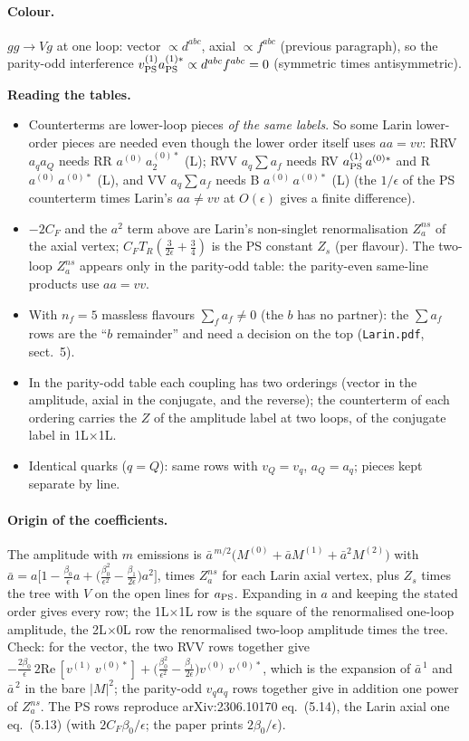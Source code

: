 \documentclass[11pt,a4paper]{article}
\newcommand{\ep}{\epsilon}
\renewcommand{\Re}{\mathrm{Re}\,}
\newcommand{\PS}{_{\rm PS}}
\newcommand{\pc}[4]{#1^{(#2)}\,#3^{(#4)*}}
\newcommand{\note}[1]{\par\smallskip\noindent\colorbox{gray!12}{\parbox{\dimexpr\linewidth-2\fboxsep}{\small #1}}\par\smallskip}
\begin{document}
\paragraph{Colour.} $gg\to Vg$ at one loop: vector $\propto d^{abc}$, axial $\propto f^{abc}$ (previous paragraph), so the
parity-odd interference $v\PS^{(1)}a\PS^{(1)*}\propto d^{abc}f^{abc}=0$ (symmetric times antisymmetric).

\note{\textbf{Reading the tables.}
\begin{itemize}
\item Counterterms are lower-loop pieces \emph{of the same labels}. So some Larin lower-order pieces are needed even
though the lower order itself uses $aa=vv$: RRV $a_qa_Q$ needs RR $\pc a0{a_2}0$ (L); RVV $a_q\sum a_f$ needs RV
$\pc{a\PS}1a0$ and R $\pc a0a0$ (L), and VV $a_q\sum a_f$ needs B $\pc a0a0$ (L) (the $1/\ep$ of the PS counterterm
times Larin's $aa\neq vv$ at $O(\ep)$ gives a finite difference).
\item $-2C_F$ and the $a^2$ term above are Larin's non-singlet renormalisation $Z_a^{ns}$ of the axial vertex;
$C_FT_R(\frac3{2\ep}+\frac34)$ is the PS constant $Z_s$ (per flavour). The two-loop $Z_a^{ns}$ appears only in the
parity-odd table: the parity-even same-line products use $aa=vv$.
\item With $n_f=5$ massless flavours $\sum_fa_f\neq0$ (the $b$ has no partner): the $\sum a_f$ rows are the ``$b$
remainder'' and need a decision on the top (\texttt{Larin.pdf}, sect.~5).
\item In the parity-odd table each coupling has two orderings (vector in the amplitude, axial in the conjugate, and
the reverse); the counterterm of each ordering carries the $Z$ of the amplitude label at two loops, of the conjugate
label in 1L$\times$1L.
\item Identical quarks ($q=Q$): same rows with $v_Q=v_q$, $a_Q=a_q$; pieces kept separate by line.
\end{itemize}}

\paragraph{Origin of the coefficients.} The amplitude with $m$ emissions is
$\bar a^{\,m/2}\big(M^{(0)}+\bar aM^{(1)}+\bar a^2M^{(2)}\big)$ with
$\bar a=a\big[1-\frac{\beta_0}{\ep}a+\big(\frac{\beta_0^2}{\ep^2}-\frac{\beta_1}{2\ep}\big)a^2\big]$, times
$Z_a^{ns}$ for each Larin axial vertex, plus $Z_s$ times the tree with $V$ on the open lines for $a\PS$. Expanding
in $a$ and keeping the stated order gives every row; the 1L$\times$1L row is the square of the renormalised one-loop
amplitude, the 2L$\times$0L row the renormalised two-loop amplitude times the tree. Check: for the vector, the two RVV
rows together give $-\frac{2\beta_0}{\ep}\,2\Re[\pc v1v0]+\big(\frac{\beta_0^2}{\ep^2}-\frac{\beta_1}{2\ep}\big)\pc v0v0$,
which is the expansion of $\bar a^{\,1}$ and $\bar a^{\,2}$ in the bare $|M|^2$; the parity-odd $v_qa_q$ rows
together give in addition one power of $Z_a^{ns}$. The PS rows reproduce arXiv:2306.10170 eq.~(5.14), the Larin
axial one eq.~(5.13) (with $2C_F\beta_0/\ep$; the paper prints $2\beta_0/\ep$).
\end{document}
